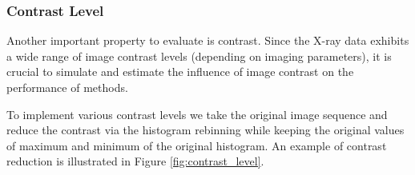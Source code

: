  

\subsubsection{Contrast Level}
\label{model_contrast_level}

Another important property to evaluate is contrast. Since the X-ray data exhibits a wide range of image contrast levels (depending on imaging parameters), it is crucial to simulate and estimate the influence of image contrast on the performance of \opticalflow methods. 

To implement various contrast levels we take the original image sequence and reduce the contrast via the histogram rebinning while keeping the original values of maximum and minimum of the original histogram. An example of contrast reduction is illustrated in Figure \ref{fig:contrast_level}. 



